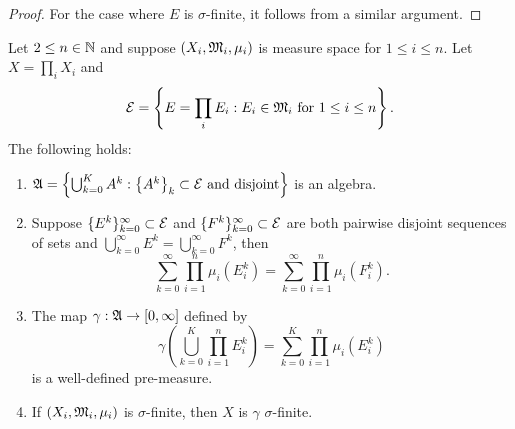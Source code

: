 \documentclass[a4paper]{article}
\renewcommand{\cupinfk}{\bigcup_{k=0}^\infty}
\renewcommand{\suminfk}{\sum_{k=0}^\infty}
\renewcommand{\seqinfk}[1]{\{ #1 \}_{k=0}^\infty}
\renewcommand{\cupk}{\bigcup_{k=0}}
\renewcommand{\sumk}{\sum_{k=0}}
\begin{document}
\begin{proof}
  For the case where $E$ is $\sigma$-finite, it follows from a similar
  argument.

\end{proof}

\begin{thm}
  Let $2 \leq n \in \mathbb{N}$ and suppose $(X_i, \mathfrak{M}_i, \mu_i)$
  is measure space for $1 \leq i \leq n$. Let
  $X = \prod_i X_i$ and
  \[
    \mathcal{E} = \left\{ E = \prod_i E_i :
    \text{$E_i \in \mathfrak{M}_i$ for $1 \leq i \leq n$} \right\}.
  \]
  The following holds:
  \begin{enumerate}
    \item $\afk = \left\{ \cupk^K A^k :
            \text{$\left\{ A^k \right\}_k \subset \ecal$ and disjoint}
            \right\}$ is an algebra.

    \item Suppose $\seqinfk{E^k} \subset \ecal$ and $\seqinfk{F^k} \subset
          \ecal$ are both pairwise disjoint sequences of sets and
          $\cupinfk{E^k} = \cupinfk{F^k}$, then
          \[
            \suminfk \prod_{i=1}^n \mu_i(E_i^k) =
            \suminfk \prod_{i=1}^n \mu_i(F_i^k).
          \]

    \item The map $\gamma: \mathfrak{A} \to [0, \infty]$ defined by
          \[
            \gamma \left( \cupk^K \prod_{i=1}^n E_i^k \right)
            = \sumk^K \prod_{i=1}^n \mu_i(E_i^k)
          \]
          is a well-defined pre-measure.

    \item If $(X_i, \mathfrak{M}_i, \mu_i)$ is $\sigma$-finite, then $X$ is
          $\gamma$ $\sigma$-finite.
  \end{enumerate}
\end{thm}
\end{document}
